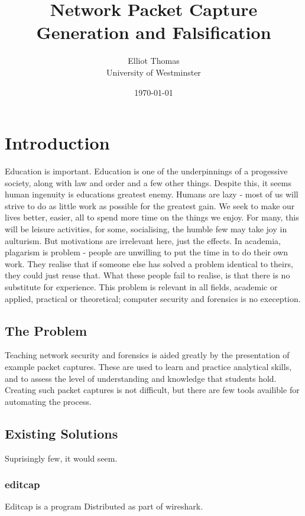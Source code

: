 \documentclass[10pt,a4paper]{report}
\author{Elliot Thomas\\ University of Westminster}
\title{Network Packet Capture Generation and Falsification}
\date{\today}
\begin{document}
\maketitle
\begin{abstract}
\end{abstract}
\pagebreak
\tableofcontents

\chapter{Introduction}
Education is important. Education is one of the underpinnings of a progessive society, along with law and order and a few other things.
Despite this, it seems human ingenuity is educations greatest enemy. Humans are lazy - most of us will strive to do as little work as possible for the greatest gain.
We seek to make our lives better, easier, all to spend more time on the things we enjoy. For many, this will be leisure activities, for some, socialising, the humble few may take joy in aulturism.
But motivations are irrelevant here, just the effects.
In academia, plagarism is problem - people are unwilling to put the time in to do their own work. They realise that if someone else has solved a problem identical to theirs, they could just reuse that.
What these people fail to realise, is that there is no substitute for experience. This problem is relevant in all fields, academic or applied, practical or theoretical; computer security and forensics is no exeception.

\section{The Problem}
Teaching network security and forensics is aided greatly by the presentation of example packet captures. These are used to learn and practice analytical skills, and to assess the level of understanding and knowledge that students hold.
Creating such packet captures is not difficult, but there are few tools availible for automating the process.

\section{Existing Solutions}
Suprisingly few, it would seem.

\subsection{editcap}
Editcap is a program Distributed as part of wireshark.
\end{document}
